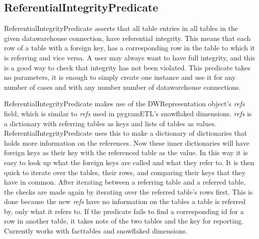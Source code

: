 \subsection{ReferentialIntegrityPredicate}
ReferentialIntegrityPredicate asserts that all table entries in all tables in the given datawarehouse connection, have referential integrity. This means that each row of a table with a foreign key, has a corresponding row in the table to which it is referring and vice versa. A user may always want to have full integrity, and this is a good way to check that integrity has not been violated. This predicate takes no parameters, it is enough to simply create one instance and use it for any number of cases and with any number number of datawarehouse connections.

ReferentialIntegrityPredicate makes use of the DWRepresentation object's \emph{refs} field, which is similar to \emph{refs} used in pygramETL's snowflaked dimensions. \emph{refs} is a dictionary with referring tables as keys and lists of tables as values. ReferentialIntegrityPredicate uses this to make a dictionary of dictionaries that holds more information on the references. Now these inner dictionaries will have foreign keys as their key with the referenced table as the value. In this way it is easy to look up what the foreign keys are called and what they refer to. It is then quick to iterate over the tables, their rows, and comparing their keys that they have in common. After iterating between a referring table and a referred table, the checks are made again by iterating over the referred table's rows first. This is done because the new \emph{refs} have no information on the tables a table is referred by, only what it refers to. If the predicate fails to find a corresponding id for a row in another table, it takes note of the two tables and the key for reporting. Currently works with facttables and snowflaked dimensions.